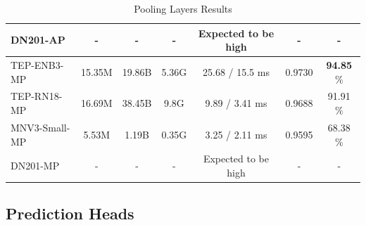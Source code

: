 \begin{table}[H]
{\begin{minipage}{0.95\textwidth}
\begin{tabular}{lcccccc}
            \rowcolor{white}     DN201-AP      & -                 & -              & -              & Expected to be high     & -               & - \\ 
            \hline
            \rowcolor[gray]{0.9} TEP-ENB3-MP   & 15.35M            & 19.86B         & 5.36G          & 25.68 / 15.5 ms         & 0.9730          & \textbf{94.85} \% \\ 
            \rowcolor{white}     TEP-RN18-MP   & 16.69M            & 38.45B         & 9.8G           & 9.89 / 3.41 ms          & 0.9688          & 91.91 \% \\ 
            \rowcolor[gray]{0.9} MNV3-Small-MP & 5.53M             & 1.19B          & 0.35G          & 3.25 / 2.11 ms          & 0.9595          & 68.38 \% \\ 
            \rowcolor{white}     DN201-MP      & -                 & -              & -              & Expected to be high     & -               & - \\ 
            \hline
        \end{tabular}
    \end{minipage}
    }
    \caption{Pooling Layers Results}
    \label{tab:poolongResults}
\end{table}

\subsection{Prediction Heads}

\begin{table}[H]
    \centering
    \caption{Prediction Heads Results}
    \label{tab:predHeadsResults}
\end{table}

